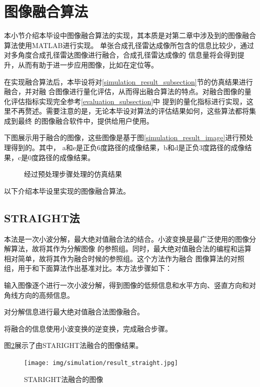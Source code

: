 \documentclass{xduugthesis}
\begin{document}
\section{图像融合算法}\label{merge_algorithm_section}
本小节介绍本毕设中图像融合算法的实现，其本质是对第二章中涉及到的图像融合算法使用MATLAB进行实现。
单张合成孔径雷达成像所包含的信息比较少，通过对多角度合成孔径雷达图像进行融合，合成孔径雷达成像的
信息量将会得到提升，从而有助于进一步应用图像，比如在定位等。\par
在实现融合算法后，本毕设将对\ref{simulation_result_subsection}节的仿真结果进行融合，并对融
合图像进行量化评估，从而得出融合算法的特点。对融合图像的量化评估指标实现完全参考\ref{evaluation_subsection}中
提到的量化指标进行实现，这里不再赘述。需要注意的是，无论本毕设对算法的评估结果如何，这些算法都将集成到最终
的图像融合软件中，提供给用户使用。\par
下图展示用于融合的图像，这些图像是基于图\ref{simulation_result_image}进行预处理得到的。其中，
a和e是正负6度路径的成像结果，b和d是正负3度路径的成像结果，c是0度路径的成像结果。
\begin{figure}[!htb]
	\centering
	\caption{经过预处理步骤处理的仿真结果}\label{simulation_dealt_image}
\end{figure}\par
以下介绍本毕设里实现的图像融合算法。\par
\subsection{STRAIGHT法}
本法是一次小波分解，最大绝对值融合法的结合。小波变换是最广泛使用的图像分解算法，故将其作为分解图像
的参照组。同时，最大绝对值融合法的编程和运算相对简单，故将其作为融合时候的参照组。这个方法作为融合
图像算法的对照组，用于和下面算法作出基准对比。本方法步骤如下：\\
\begin{enumerate*}[itemjoin=\\\hspace*{\parindent}, itemsep=5mm\hspace*{\parindent}]
	\item 输入图像逐个进行一次小波分解，得到图像的低频信息和水平方向、竖直方向和对角线方向的高频信息。
	\item 对分解信息进行最大绝对值融合法图像融合。
	\item 将融合的信息使用小波变换的逆变换，完成融合步骤。
\end{enumerate*}\par
图\ref{simulation_straight}展示了由STARIGHT法融合的图像结果。
\begin{figure}[!htb]
	\texttt{[image: img/simulation/result\_straight.jpg]}
	\caption{STARIGHT法融合的图像}\label{simulation_straight}
\end{figure}
\end{document}
